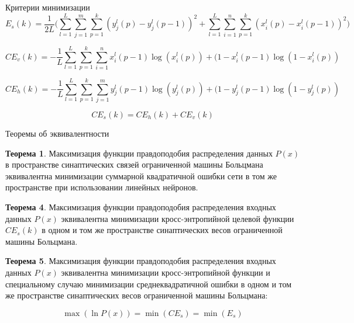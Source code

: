 \documentclass[10pt]{beamer}
\begin{document}
        \begin{frame}{Критерии минимизации}
            \begin{equation*}	
                E_s(k)=\frac{1}{2L}\Bigg(\sum_{l=1}^L\sum_{j=1}^m\sum_{p=1}^k (y_j^l(p)-y_j^l(p-1))^2+\sum_{l=1}^L\sum_{i=1}^n\sum_{p=1}^k (x_i^l(p)-x_i^l(p-1))^2\Bigg)
            \end{equation*}

            \begin{equation*}
	           CE_v(k) = -\frac{1}{L}\sum_{l=1}^L \sum_{p=1}^k \sum_{i=1}^n x_i^l(p-1)\log(x_i^l(p))+(1-x_i^l(p-1)\log(1-x_i^l(p))
            \end{equation*}

            \begin{equation*}
	           CE_h(k) = -\frac{1}{L}\sum_{l=1}^L \sum_{p=1}^k \sum_{j=1}^m y_j^l(p-1)\log(y_j^l(p))+(1-y_j^l(p-1)\log(1-y_j^l(p))
            \end{equation*}

            \begin{equation*}
	       CE_s(k) = CE_h(k)+CE_v(k)
            \end{equation*}
        \end{frame}

        \begin{frame}{Теоремы об эквивалентности}
            \begin{block}{}
                \textbf{Теорема 1}. Максимизация функции правдоподобия распределения данных $P(x)$ в пространстве синаптических связей ограниченной машины Больцмана эквивалентна минимизации суммарной квадратичной ошибки сети в том же пространстве при использовании линейных нейронов.
            \end{block}

            \begin{block}{}
                \textbf{Теорема 4}. Максимизация функции правдоподобия распределения входных данных $P(x)$ эквивалентна минимизации кросс-энтропийной целевой функции $CE_s(k)$ в одном и том же пространстве синаптических весов ограниченной машины Больцмана.
            \end{block}

            \begin{block}{}
                \textbf{Теорема 5}. Максимизация функции правдоподобия распределения входных данных $P(x)$ эквивалентна минимизации кросс-энтропийной функции и специальному случаю минимизации среднеквадратичной ошибки в одном и том же пространстве синаптических весов ограниченной машины Больцмана:
    
                \begin{equation*}
                	\max(\ln P(x)) = \min(CE_s) = \min(E_s)
                \end{equation*}
            \end{block}
        \end{frame}
\end{document}
